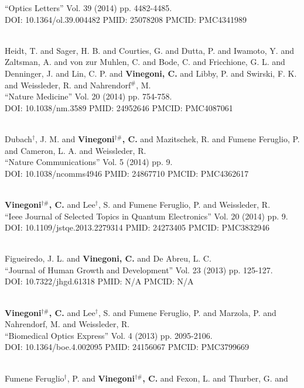 ``Optics Letters'' Vol. 39 (2014) pp. 4482-4485. \\ DOI: 10.1364/ol.39.004482 PMID: 25078208 PMCID: PMC4341989\item {} \\ Heidt, T. and Sager, H. B. and Courties, G. and Dutta, P. and Iwamoto, Y. and Zaltsman, A. and von zur Muhlen, C. and Bode, C. and Fricchione, G. L. and Denninger, J. and Lin, C. P. and {\bf Vinegoni, C.} and Libby, P. and Swirski, F. K. and Weissleder, R. and Nahrendorf$^\#$, M. \\ ``Nature Medicine'' Vol. 20 (2014) pp. 754-758. \\ DOI: 10.1038/nm.3589 PMID: 24952646 PMCID: PMC4087061\item {} \\ Dubach$^\dag$, J. M. and {\bf Vinegoni$^{\dag \#}$, C.} and Mazitschek, R. and Fumene Feruglio, P. and Cameron, L. A. and Weissleder, R. \\ ``Nature Communications'' Vol. 5 (2014) pp. 9. \\ DOI: 10.1038/ncomms4946 PMID: 24867710 PMCID: PMC4362617\item {} \\ {\bf Vinegoni$^{\dag \#}$, C.} and Lee$^\dag$, S. and Fumene Feruglio, P. and Weissleder, R. \\ ``Ieee Journal of Selected Topics in Quantum Electronics'' Vol. 20 (2014) pp. 9. \\ DOI: 10.1109/jstqe.2013.2279314 PMID: 24273405 PMCID: PMC3832946\item {} \\ Figueiredo, J. L. and {\bf Vinegoni, C.} and De Abreu, L. C. \\ ``Journal of Human Growth and Development'' Vol. 23 (2013) pp. 125-127. \\ DOI: 10.7322/jhgd.61318 PMID: N/A PMCID: N/A\item {} \\ {\bf Vinegoni$^{\dag \#}$, C.} and Lee$^\dag$, S. and Fumene Feruglio, P. and Marzola, P. and Nahrendorf, M. and Weissleder, R. \\ ``Biomedical Optics Express'' Vol. 4 (2013) pp. 2095-2106. \\ DOI: 10.1364/boe.4.002095 PMID: 24156067 PMCID: PMC3799669\item {} \\ Fumene Feruglio$^\dag$, P. and {\bf Vinegoni$^{\dag \#}$, C.} and Fexon, L. and Thurber, G. and 